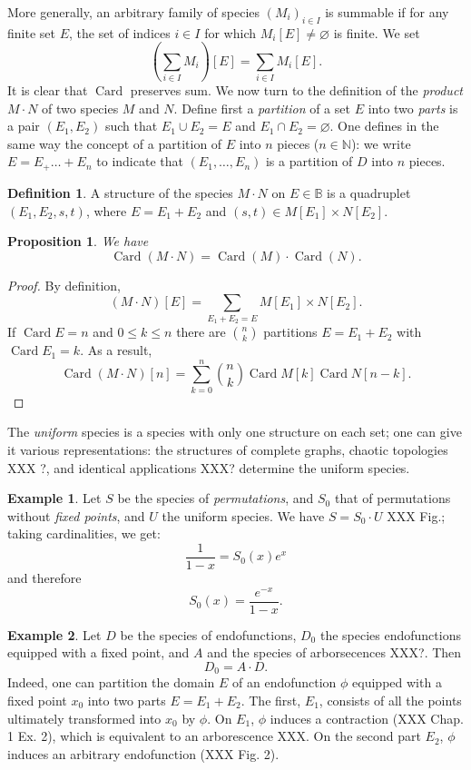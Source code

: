 \documentclass{article}
\newtheorem{prop}[thm]{Proposition}
\theoremstyle{definition}
\newtheorem{defn}[thm]{Definition}
\newtheorem{ex}{Example}
\theoremstyle{remark}
\newcommand{\B}{\mathbb{B}}
\newcommand{\N}{\mathbb{N}}
\DeclareMathOperator{\Card}{Card}
\newcommand{\term}[1]{\emph{#1}}
\newcommand{\union}{\cup}
\newcommand{\intersect}{\cap}
\begin{document}
More generally, an arbitrary family of species $(M_i)_{i \in I}$ is
summable if for any finite set $E$, the set of indices $i \in I$ for
which $M_i[E] \neq \varnothing$ is finite.  We set
\[ \left( \sum_{i \in I} M_i \right) [ E ] = \sum_{i \in I} M_i[E]. \]
It is clear that $\Card$ preserves sum. We now turn to the definition
of the \term{product} $M \cdot N$ of two species $M$ and $N$. Define
first a \term{partition} of a set $E$ into two \term{parts} is a pair
$(E_1, E_2)$ such that $E_1 \union E_2 = E$ and $E_1 \intersect E_2 =
\varnothing$. One defines in the same way the concept of a partition
of $E$ into $n$ pieces ($n \in \N$): we write $E = E_ + \dots + E_n$
to indicate that $(E_1, \dots, E_n)$ is a partition of $D$ into $n$
pieces.

\begin{defn}
  A structure of the species $M \cdot N$ on $E \in \B$ is a quadruplet
  $(E_1, E_2, s, t)$, where $E = E_1 + E_2$ and $(s, t) \in M[E_1]
  \times N [E_2]$.
\end{defn}

\begin{prop}
We have
\[ \Card (M \cdot N) = \Card (M) \cdot \Card (N). \]
\end{prop}
\begin{proof}
By definition,
\[ (M \cdot N)[E] = \sum_{E_1 + E_2 = E} M[E_1] \times N[E_2]. \]
If $\Card E = n$ and $0 \leq k \leq n$ there are $\binom n k$
partitions $E = E_1 + E_2$ with $\Card E_1 = k$.  As a result,
\[ \Card(M \cdot N) [n] = \sum_{k=0}^n \binom n k \Card M [k] \Card N
[n - k]. \]
\end{proof}

The \term{uniform} species is a species with only one structure on each
set; one can give it various representations: the structures of
complete graphs, chaotic topologies XXX ?, and identical applications XXX? determine
the uniform species.

\begin{ex}
Let $S$ be the species of \term{permutations}, and $S_0$ that of
permutations without \emph{fixed points}, and $U$ the uniform species. We have $S = S_0 \cdot U$
XXX Fig.; taking cardinalities, we get:
\[ \frac{1}{1-x} = S_0 (x) e^x \]
and therefore
\[ S_0 (x) = \frac{e^{-x}}{1 - x}. \]
\end{ex}

\begin{ex}
Let $D$ be the species of endofunctions, $D_0$ the species
endofunctions equipped with a fixed point, and $A$ and the species of arborsecences XXX?. Then
\[ D_0 = A \cdot D. \]
Indeed, one can partition the domain $E$ of an endofunction $\phi$ equipped with a
fixed point $x_0$ into two parts $E = E_1 + E_2$. The first, $E_1$, consists of
all the points ultimately transformed into $x_0$ by $\phi$. On $E_1$, $\phi$ induces
a contraction (XXX Chap. 1 Ex. 2), which is equivalent to an arborescence XXX. On
the second part $E_2$, $\phi$ induces an arbitrary endofunction (XXX
Fig. 2).
\end{ex}
\end{document}
